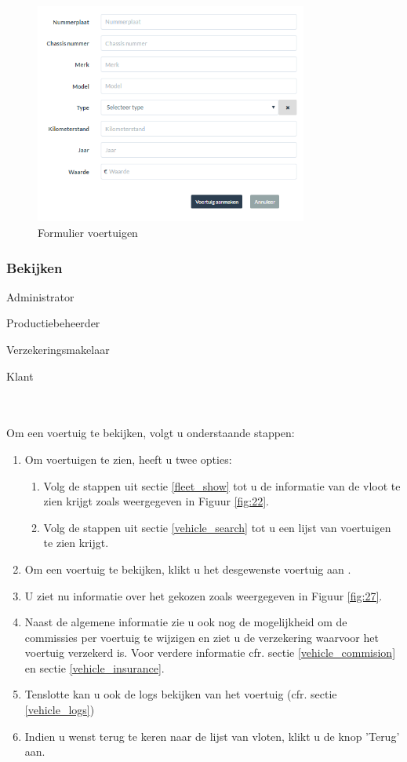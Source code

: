 \documentclass[11pt,openany]{article}
\newcommand{\cmark}{\ding{51}}%
\newcommand{\done}{\rlap{$\square$}{\raisebox{2pt}{\large\hspace{1pt}\cmark}}%
	\hspace{-2.5pt}}
\begin{document}
\begin{figure}
	\centering
	\includegraphics[width=0.8\textwidth]{img/fig26.png}
	\caption{Formulier voertuigen} 
	\label{fig:26} 
\end{figure}



\subsubsection{Bekijken}
\label{vehicle_show}
\begin{todolist}
	\item[\done] Administrator
	\item[\done] Productiebeheerder
	\item[\done] Verzekeringsmakelaar
	\item[\done] Klant 
\end{todolist}
\\
\\
Om een voertuig te bekijken, volgt u onderstaande stappen:
\begin{enumerate}
	\item Om voertuigen te zien, heeft u twee opties:
	\begin{enumerate}
		\item Volg de stappen uit sectie \ref{fleet_show} tot u de informatie van de vloot te zien krijgt zoals weergegeven in Figuur \ref{fig:22}.
		\item Volg de stappen uit sectie \ref{vehicle_search} tot u een lijst van voertuigen te zien krijgt.
	\end{enumerate}
	\item Om een voertuig te bekijken, klikt u het desgewenste voertuig aan	. 
	\item U ziet nu informatie over het gekozen zoals weergegeven in Figuur \ref{fig:27}.
	\item Naast de algemene informatie zie u ook nog de mogelijkheid om de commissies per voertuig te wijzigen en ziet u de verzekering waarvoor het voertuig verzekerd is. Voor verdere informatie cfr. sectie \ref{vehicle_commision} en sectie \ref{vehicle_insurance}.
	\item Tenslotte kan u ook de logs bekijken van het voertuig (cfr. sectie \ref{vehicle_logs})
	\item Indien u wenst terug te keren naar de lijst van vloten, klikt u de knop 'Terug' aan.
\end{enumerate}
\end{document}
